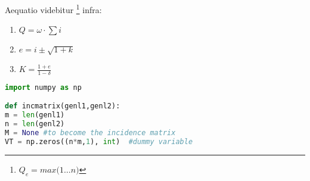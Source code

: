 %
%

\lipsum[11]


	\lipsum[2]
	
	
	\newp Aequatio videbitur \footnote{ $Q_e = max\big(1 \dots n\big)$} infra:
	
	

	\lipsum[4]

	\begin{enumerate}
		\item {$Q = \omega \cdot \sum i$}
		\item {$e = i \pm \sqrt{1+k}$}
		\item {$K = \frac{1 + e}{1 - \delta}$}
	\end{enumerate}


	\lipsum[15]

\newp
\lstset{style=Python}
\begin{lstlisting}[language=Python]
import numpy as np

def incmatrix(genl1,genl2):
m = len(genl1)
n = len(genl2)
M = None #to become the incidence matrix
VT = np.zeros((n*m,1), int)  #dummy variable
\end{lstlisting}